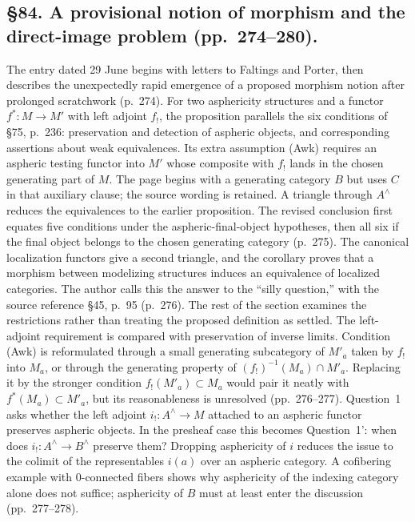 \documentclass[10pt,oneside]{book}
\begin{document}
\subsection*{\S84. A provisional notion of morphism and the direct-image problem (pp.\ 274--280).}
The entry dated 29 June begins with letters to Faltings and Porter, then describes the unexpectedly rapid emergence of a proposed morphism notion after prolonged scratchwork (p.\ 274). For two asphericity structures and a functor $f^*:M\to M'$ with left adjoint $f_!$, the proposition parallels the six conditions of \S75, p.\ 236: preservation and detection of aspheric objects, and corresponding assertions about weak equivalences. Its extra assumption (Awk) requires an aspheric testing functor into $M'$ whose composite with $f_!$ lands in the chosen generating part of $M$. The page begins with a generating category $B$ but uses $C$ in that auxiliary clause; the source wording is retained. A triangle through $A^\wedge$ reduces the equivalences to the earlier proposition. The revised conclusion first equates five conditions under the aspheric-final-object hypotheses, then all six if the final object belongs to the chosen generating category (p.\ 275). The canonical localization functors give a second triangle, and the corollary proves that a morphism between modelizing structures induces an equivalence of localized categories. The author calls this the answer to the “silly question,” with the source reference \S45, p.\ 95 (p.\ 276).
The rest of the section examines the restrictions rather than treating the proposed definition as settled. The left-adjoint requirement is compared with preservation of inverse limits. Condition (Awk) is reformulated through a small generating subcategory of $M'_a$ taken by $f_!$ into $M_a$, or through the generating property of $(f_!)^{-1}(M_a)\cap M'_a$. Replacing it by the stronger condition $f_!(M'_a)\subset M_a$ would pair it neatly with $f^*(M_a)\subset M'_a$, but its reasonableness is unresolved (pp.\ 276--277). Question~1 asks whether the left adjoint $i_!:A^\wedge\to M$ attached to an aspheric functor preserves aspheric objects. In the presheaf case this becomes Question~1': when does $i_!:A^\wedge\to B^\wedge$ preserve them? Dropping asphericity of $i$ reduces the issue to the colimit of the representables $i(a)$ over an aspheric category. A cofibering example with 0-connected fibers shows why asphericity of the indexing category alone does not suffice; asphericity of $B$ must at least enter the discussion (pp.\ 277--278).
\end{document}
